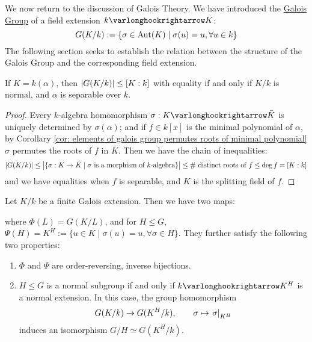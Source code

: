 \textstart
We now return to the discussion of Galois Theory. We have introduced the \underline{Galois Group} of a field extension $k \ext K$:
\[
    G(K/k) := \{ \sigma \in \mathrm{Aut}(K) \mid \sigma(u) = u, \forall u \in k \}
\]
The following section seeks to establish the relation between the structure of the Galois Group and the corresponding field extension. 

\begin{proposition}
    If $K = k(\alpha)$, then $\left|G(K/k)\right| \leq [K : k]$ with equality if and only if $K/k$ is normal, and $\alpha$ is separable over $k$.
\end{proposition}

\begin{proof}
    Every $k$-algebra homomorphism $\sigma: K \ext \bar{K}$ is uniquely determined by $\sigma(\alpha)$; and if $f \in k[x]$ is the minimal polynomial of $\alpha$, by Corollary \ref{cor: elements of galois group permutes roots of minimal polynomial} $\sigma$ permutes the roots of $f$ in $\bar{K}$. Then we have the chain of inequalities:
    \[
        \left|G(K/k)\right| \leq \left|\{\sigma: K \to \bar{K} \mid \text{$\sigma$ is a morphism of $k$-algebra}\}\right| \leq \text{\# distinct roots of $f$} \leq \deg f = [K : k]
    \]
    and we have equalities when $f$ is separable, and $K$ is the splitting field of $f$. 
\end{proof}

\begin{theorem}\label{thm: fundamental theorem of galois theory}
    Let $K/k$ be a finite Galois extension. Then we have two maps:
    \begin{minipage}{\linewidth}
        \centering
        \vspace{1em}
        \vspace{1em}
    \end{minipage}
    where $\Phi(L) = G(K/L)$, and for $H \leq G$, $\Psi(H) = K^{H} := \{u \in K \mid \sigma(u) = u, \forall \sigma \in H\}$. They further satisfy the following two properties:
    \begin{enumerate}[label=\arabic*)]
        \item $\Phi$ and $\Psi$ are order-reversing, inverse bijections.
        \item $H \leq G$ is a normal subgroup if and only if $k \ext K^H$ is a normal extension. In this case, the group homomorphism
        \[
            G(K/k) \to G(K^H/k), \qquad \sigma \mapsto \left.\sigma\right|_{K^H}
        \]
        induces an isomorphism $G/H \simeq G(K^H/k)$. 
    \end{enumerate}
\end{theorem}

